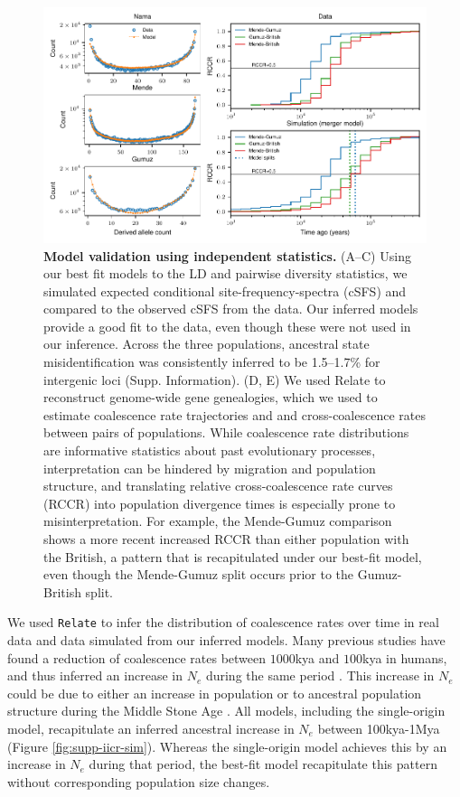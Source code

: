 \documentclass[]{article}
\begin{document}
\begin{figure}[t!]
    \centering
    \includegraphics{figures/fig4}
    \caption{
        \textbf{Model validation using independent statistics.} (A--C) Using
        our best fit models to the LD and pairwise diversity statistics, we
        simulated expected conditional site-frequency-spectra (cSFS) and
        compared to the observed cSFS from the data. Our inferred models
        provide a good fit to the data, even though these were not used in our
        inference. Across the three populations, ancestral state
        misidentification was consistently inferred to be 1.5--1.7\% for
        intergenic loci (Supp. Information). (D, E) We used Relate
        \citep{Speidel2019-nj} to reconstruct genome-wide gene genealogies,
        which we used to estimate coalescence rate trajectories and
        and cross-coalescence rates between pairs of populations. While
        coalescence rate distributions are informative statistics about past
        evolutionary processes, interpretation can be hindered by migration and
        population structure, and translating relative cross-coalescence rate
        curves (RCCR) into population divergence times is especially prone
        to misinterpretation. For example, the Mende-Gumuz comparison shows
        a more recent increased RCCR than either population with the British,
        a pattern that is recapitulated under our best-fit model, even though
        the Mende-Gumuz split occurs prior to the Gumuz-British split.
    }
    \label{fig:4}
\end{figure}

We used \texttt{Relate} \citep{Speidel2019-nj} to infer the distribution of
coalescence rates over time in real data and data simulated from our inferred models. Many 
previous studies have found a reduction of coalescence rates 
between $1000$kya and $100$kya in humans, and thus inferred an increase 
in $N_e$ during the same period \citep{Li2011-le}.
This increase in $N_e$ could be due to either an increase in population or to 
ancestral population structure during the Middle Stone Age \citep{Mazet2016-wn}.
All models, including the
single-origin model, recapitulate an inferred ancestral
increase in $N_e$ between 100kya-1Mya (Figure \ref{fig:supp-iicr-sim}). Whereas the single-origin model achieves this by
an increase in $N_e$ during that period, the best-fit model recapitulate this pattern without corresponding population size changes.      
\end{document}
